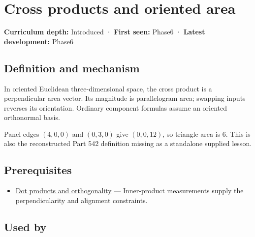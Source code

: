 \hypertarget{appendix-2391db8052b1}{}
\section{Cross products and oriented area}\label{appendix-2391db8052b1-cross-products-and-oriented-area}

\textbf{Curriculum depth:} Introduced · \textbf{First seen:} Phase6 · \textbf{Latest development:} Phase6

\subsection{Definition and mechanism}\label{appendix-2391db8052b1-definition-and-mechanism}

In oriented Euclidean three-dimensional space, the cross product is a perpendicular area vector. Its magnitude is parallelogram area; swapping inputs reverses its orientation. Ordinary component formulas assume an oriented orthonormal basis.

Panel edges \((4,0,0)\) and \((0,3,0)\) give \((0,0,12)\), so triangle area is \(6\). This is also the reconstructed Part 542 definition missing as a standalone supplied lesson.

\subsection{Prerequisites}\label{appendix-2391db8052b1-prerequisites}

\begin{itemize}
\tightlist
\item
  \hyperref[appendix-8bc4e8fc547c]{Dot products and orthogonality} --- Inner-product measurements supply the perpendicularity and alignment constraints.
\end{itemize}

\subsection{Used by}\label{appendix-2391db8052b1-used-by}

